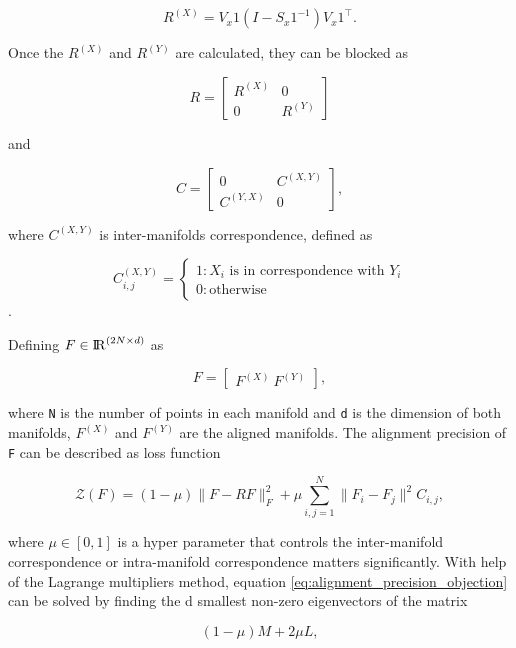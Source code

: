   \begin{equation}
    R^{(X)}=V_x1(I-S_x1^{-1})V_x1^\intercal.
  \end{equation}

  Once the $R^{(X)}$ and $R^{(Y)}$ are calculated, they can be blocked as
  
  \[R= \begin{bmatrix}
        R^{(X)} & 0 \\
        0 & R^{(Y)}
      \end{bmatrix}\]

  and

  \[C=\begin{bmatrix}
        0 & C^{(X,Y)}\\
        C^{(Y,X)} & 0
      \end{bmatrix},\]

  where $C^{(X,Y)}$ is inter-manifolds correspondence, defined as

  \[C_{i,j}^{(X,Y)}=\begin{cases}
                      1 : X_i\text{ is in correspondence with }Y_i\\
                      0 : \text{otherwise}
                    \end{cases}\].

  Defining $F\in {\rm I\!R}^{(2N\times d)}$ as

  \[F=\begin{bmatrix}
        F^{(X)}\
        F^{(Y)}
      \end{bmatrix},\]

  where \verb|N| is the number of points in each manifold and \verb|d| is the dimension of both manifolds, $F^{(X)}$ and $F^{(Y)}$ are the aligned manifolds. The alignment precision of \verb|F| can be described as loss function

  \begin{equation}\label{eq:alignment_precision_objection}
    \mathcal{Z}(F)=(1-\mu )\|F-RF\|^2_F+\mu\sum_{i,j=1}^N\|F_i-F_j\|^2C_{i,j},
  \end{equation}

  where $\mu\in[0,1]$ is a hyper parameter that controls the inter-manifold correspondence or intra-manifold correspondence matters significantly. With help of the Lagrange multipliers method, equation \eqref{eq:alignment_precision_objection} can be solved by finding the d smallest non-zero eigenvectors of the matrix

  \begin{equation}
    (1-\mu)M+2\mu L,
  \end{equation}

